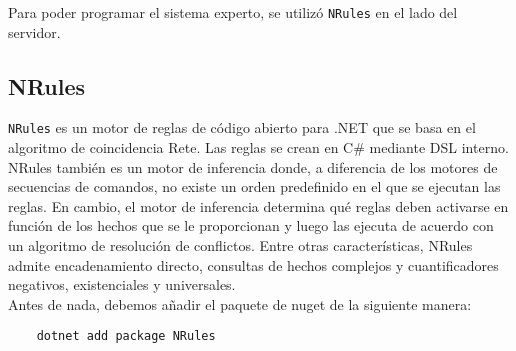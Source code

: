 Para poder programar el sistema experto, se utilizó \texttt{NRules} en el lado del servidor.

\subsection{NRules}
\texttt{NRules} es un motor de reglas de código abierto para .NET que se basa en el
algoritmo de coincidencia Rete. Las reglas se crean en C\# mediante DSL interno.\cite{nrulesRulesEngine}
\\
NRules también es un motor de inferencia donde, a diferencia de los motores de
secuencias de comandos, no existe un orden predefinido en el que se ejecutan las
reglas. En cambio, el motor de inferencia determina qué reglas deben activarse
en función de los hechos que se le proporcionan y luego las ejecuta de acuerdo
con un algoritmo de resolución de conflictos. Entre otras características,
NRules admite encadenamiento directo, consultas de hechos complejos y
cuantificadores negativos, existenciales y universales.\cite{nrulesRulesEngine}
\\
Antes de nada, debemos añadir el paquete de nuget de la siguiente manera:\cite{nrulesRulesEngine}
\begin{lstlisting}
    dotnet add package NRules
\end{lstlisting}

